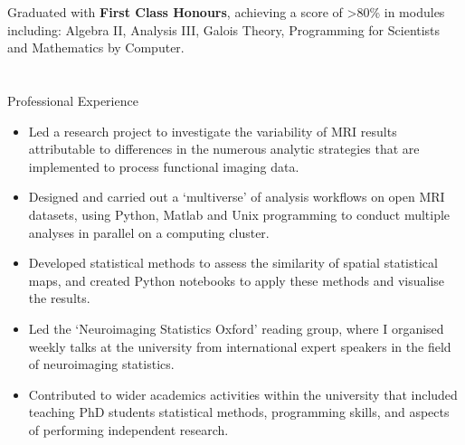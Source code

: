\documentclass{my_cv}
\begin{document}
%
    {\begin{addmargin}[2em]{1em}
    Graduated with \textbf{First Class Honours}, achieving a score of >80\% in modules including: Algebra II, Analysis III, Galois Theory, Programming for Scientists and Mathematics by Computer.
\end{addmargin}}
    
\section{\faBriefcase}{Professional Experience}

%
    {\begin{itemize}[topsep=0pt,itemsep=0pt,partopsep=0pt, parsep=0pt] 
    \item Led a research project to investigate the variability of MRI results attributable to differences in the numerous analytic strategies that are implemented to process functional imaging data. 
    \item Designed and carried out a `multiverse' of analysis workflows on open MRI datasets, using Python, Matlab and Unix programming to conduct multiple analyses in parallel on a computing cluster.
    \item Developed statistical methods to assess the similarity of spatial statistical maps, and created Python notebooks to apply these methods and visualise the results.
    \item Led the `Neuroimaging Statistics Oxford' reading group, where I organised weekly talks at the university from international expert speakers in the field of neuroimaging statistics. 
    \item Contributed to wider academics activities within the university that included teaching PhD students statistical methods, programming skills, and aspects of performing independent research.
    \end{itemize}
    }%
\end{document}
